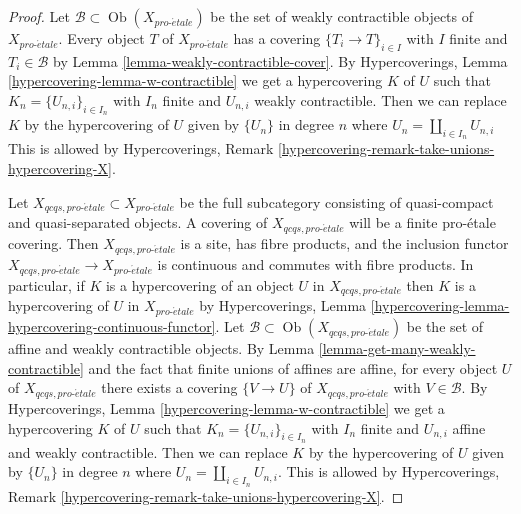\documentclass[10pt,a4paper]{amsart}
\theoremstyle{plain}
\theoremstyle{definition}
\theoremstyle{remark}
\numberwithin{equation}{subsection}
\def\Ob{\mathop{\mathrm{Ob}}\nolimits}
\def\proetale{{pro\text{-}\acute{e}tale}}
\begin{document}
\begin{proof}
Let $\mathcal{B} \subset \Ob(X_\proetale)$ be the set of weakly contractible
objects of $X_\proetale$. Every object $T$ of $X_\proetale$ has a
covering $\{T_i \to T\}_{i \in I}$ with $I$ finite and $T_i \in \mathcal{B}$ by
Lemma \ref{lemma-weakly-contractible-cover}.
By Hypercoverings, Lemma \ref{hypercovering-lemma-w-contractible}
we get a hypercovering $K$ of $U$ such that $K_n = \{U_{n, i}\}_{i \in I_n}$
with $I_n$ finite and $U_{n, i}$ weakly contractible.
Then we can replace $K$ by the hypercovering of $U$ given by $\{U_n\}$
in degree $n$ where $U_n = \coprod_{i \in I_n} U_{n, i}$
This is allowed by
Hypercoverings, Remark \ref{hypercovering-remark-take-unions-hypercovering-X}.

\medskip\noindent
Let $X_{qcqs, \proetale} \subset X_\proetale$ be the full subcategory
consisting of quasi-compact and quasi-separated objects.
A covering of $X_{qcqs, \proetale}$ will be a finite pro-\'etale covering.
Then $X_{qcqs, \proetale}$ is a site, has fibre products, and
the inclusion functor $X_{qcqs, \proetale} \to X_\proetale$ is continuous
and commutes with fibre products.
In particular, if $K$ is a hypercovering of an object $U$ in
$X_{qcqs, \proetale}$ then $K$ is a hypercovering of $U$ in $X_\proetale$
by Hypercoverings, Lemma
\ref{hypercovering-lemma-hypercovering-continuous-functor}.
Let $\mathcal{B} \subset \Ob(X_{qcqs, \proetale})$ be the set of
affine and weakly contractible objects. By 
Lemma \ref{lemma-get-many-weakly-contractible}
and the fact that finite unions of affines are affine,
for every object $U$ of $X_{qcqs, \proetale}$ there exists a covering
$\{V \to U\}$ of $X_{qcqs, \proetale}$ with $V \in \mathcal{B}$.
By Hypercoverings, Lemma \ref{hypercovering-lemma-w-contractible}
we get a hypercovering $K$ of $U$ such that $K_n = \{U_{n, i}\}_{i \in I_n}$
with $I_n$ finite and $U_{n, i}$ affine and weakly contractible.
Then we can replace $K$ by the hypercovering of $U$
given by $\{U_n\}$ in degree $n$ where
$U_n = \coprod_{i \in I_n} U_{n, i}$. This is allowed by
Hypercoverings, Remark \ref{hypercovering-remark-take-unions-hypercovering-X}.
\end{proof}
\end{document}
